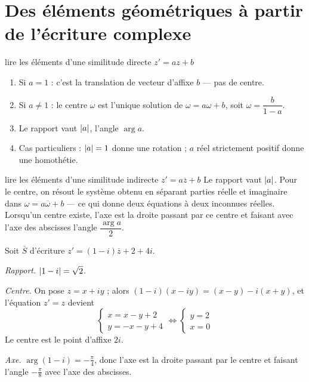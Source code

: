 \section{Des éléments géométriques à partir de l'écriture complexe}

\begin{methode}{lire les éléments d'une similitude directe $z' = az+b$}
\begin{enumerate}[label=\textbf{\arabic*.}, leftmargin=*, itemsep=0.15em]
  \item Si $a = 1$ : c'est la translation de vecteur d'affixe $b$ — pas de
        centre.
  \item Si $a \neq 1$ : le centre $\omega$ est l'unique solution de
        $\omega = a\omega+b$, soit $\omega = \dfrac{b}{1-a}$.
  \item Le rapport vaut $\left|a\right|$, l'angle $\arg a$.
  \item Cas particuliers : $\left|a\right| = 1$ donne une rotation ; $a$ réel
        strictement positif donne une homothétie.
\end{enumerate}
\end{methode}

\begin{methode}{lire les éléments d'une similitude indirecte $z' = a\overline z+b$}
Le rapport vaut $\left|a\right|$. Pour le centre, on résout le système obtenu en
séparant parties réelle et imaginaire dans $\omega = a\overline\omega+b$ — ce
qui donne deux équations à deux inconnues réelles. Lorsqu'un centre existe,
l'axe est la droite passant par ce centre et faisant avec l'axe des abscisses
l'angle $\dfrac{\arg a}{2}$.
\end{methode}

\begin{exemple}
Soit $\bar S$ d'écriture $z' = (1-i)\overline z+2+4i$.

\emph{Rapport.} $\left|1-i\right| = \sqrt2$.

\emph{Centre.} On pose $z = x+iy$ ; alors
$(1-i)(x-iy) = (x-y)-i(x+y)$, et l'équation $z' = z$ devient
\[
  \begin{cases} x = x-y+2 \\ y = -x-y+4 \end{cases}
  \iff
  \begin{cases} y = 2 \\ x = 0 \end{cases}
\]
Le centre est le point d'affixe $2i$.

\emph{Axe.} $\arg(1-i) = -\frac{\pi}{4}$, donc l'axe est la droite passant par
le centre et faisant l'angle $-\frac{\pi}{8}$ avec l'axe des abscisses.
\end{exemple}

